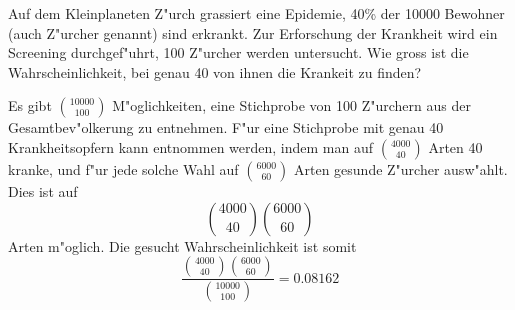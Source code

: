 Auf dem Kleinplaneten Z"urch grassiert eine Epidemie, 40\% der 10000 Bewohner
(auch Z"urcher genannt) sind
erkrankt. Zur Erforschung der Krankheit wird ein Screening durchgef"uhrt,
100 Z"urcher werden untersucht. Wie gross ist die Wahrscheinlichkeit,
bei genau 40 von ihnen die Krankeit zu finden?

\begin{loesung}
Es gibt $\binom{10000}{100}$ M"oglichkeiten, eine Stichprobe von
100 Z"urchern aus der Gesamtbev"olkerung zu entnehmen. F"ur eine
Stichprobe mit genau 40 Krankheitsopfern kann entnommen
werden, indem man auf
$\binom{4000}{40}$ Arten 40 kranke, und f"ur jede solche Wahl
auf $\binom{6000}{60}$ Arten
gesunde Z"urcher ausw"ahlt. Dies ist auf
\[
\binom{4000}{40}\binom{6000}{60}
\]
Arten m"oglich.
Die gesucht Wahrscheinlichkeit ist somit
\[
\frac{\binom{4000}{40}\binom{6000}{60}}{\binom{10000}{100}}=
0.08162
\]
\end{loesung}

